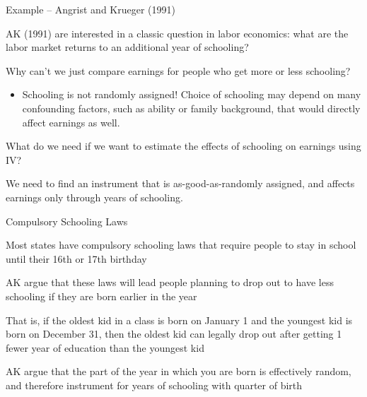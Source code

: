 \documentclass[11pt,english,handout]{beamer}
\newenvironment{wideitemize}{\itemize\addtolength{\itemsep}{10pt}}{\enditemize}
\begin{document}
\begin{frame}{Example -- Angrist and Krueger (1991)}
	\begin{wideitemize}
		\item
		AK (1991) are interested in a classic question in labor economics: what are the labor market returns to an additional year of schooling? 
		
		\pause
		\item
		Why can't we just compare earnings for people who get more or less schooling? 
			\pause
			\begin{itemize}
				\item 
				Schooling is not randomly assigned! Choice of schooling may depend on many confounding factors, such as ability or family background, that would directly affect earnings as well. 
			\end{itemize}
		
		\pause
		\item
		What do we need if we want to estimate the effects of schooling on earnings using IV? 
		
		\pause
		\item
		We need to find an instrument that is as-good-as-randomly assigned, and affects earnings only through years of schooling.  
	\end{wideitemize}
\end{frame}


\begin{frame}{Compulsory Schooling Laws}
	\begin{wideitemize}
		\item
		Most states have compulsory schooling laws that require people to stay in school until their 16th or 17th birthday
		
		\pause
		\item
		AK argue that these laws will lead people planning to drop out to have less schooling if they are born earlier in the year
		
		\item
		That is, if the oldest kid in a class is born on January 1 and the youngest kid is born on December 31, then the oldest kid can legally drop out after getting 1 fewer year of education than the youngest kid
		
		
		\pause
		\item
		AK argue that the part of the year in which you are born is effectively random, and therefore instrument for years of schooling with quarter of birth
	\end{wideitemize}
\end{frame}
\end{document}
